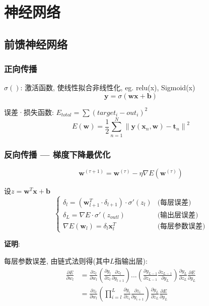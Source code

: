 \documentclass{article}
\begin{document}
\section{神经网络}
    \subsection{前馈神经网络}
        \subsubsection{正向传播}
            $\sigma()$: 激活函数, 使线性拟合非线性化, eg. relu(x), Sigmoid(x)
            $$\boldsymbol y = \sigma (\boldsymbol w \boldsymbol x + \boldsymbol b)$$


            误差·损失函数: $E_{total} = \sum (target_i - out_i)^2$
            $$E(\boldsymbol{w})=\frac{1}{2} \sum_{n=1}^{N}\left\|\boldsymbol{y}\left(\boldsymbol{x}_{n}, \boldsymbol{w}\right)-\boldsymbol{t}_{n}\right\|^{2}$$

        \subsubsection{反向传播 --- 梯度下降最优化}
    		$$\boldsymbol{w}^{(\tau+1)}=\boldsymbol{w}^{(\tau)}-\eta \nabla E\left(\boldsymbol{w}^{(\tau)}\right)$$
    		
    		设$z = \boldsymbol w^T \boldsymbol x + \boldsymbol b$
            $$\left \{ \begin{array}{lr}
                \delta_l = (\boldsymbol w_{l+1}^T·\delta_{l+1})·\sigma'(z_l) & \text{(每层误差)}\\
                \delta_L = \nabla E · \sigma'(z_{outl}) & \text{(输出层误差)}\\
                \nabla E(\boldsymbol w_l) = \delta_l \boldsymbol x_l^T & \text{(每层参数误差)}
            \end{array} \right.$$

            \textbf{证明}:
        		
        		每层参数误差, 由链式法则得(其中$L$指输出层): 
        		    \begin{align*}
        		        \frac{\partial E}{\partial w_l} 
        		        &= \frac{\partial z_l}{\partial w_l} \left(\frac{\partial y_l}{\partial z_l}\frac{\partial z_l}{\partial y_{l+1}}\right) ... \left(\frac{\partial y_{L-1}}{\partial z_{L-1}} \frac{\partial z_{L-1}}{\partial y_L} \right) \frac{\partial y_L}{\partial z_L} \frac{\partial E}{\partial y_L}\\
        		        &= \frac{\partial z_l}{\partial w_l}  \left(\prod_{i = l}^{L} \frac{\partial y_i}{\partial z_i}\frac{\partial z_i}{\partial y_{i+1}} \right) \frac{\partial y_L}{\partial z_L} \frac{\partial E}{\partial y_L}
        		    \end{align*}
        		    
\end{document}
